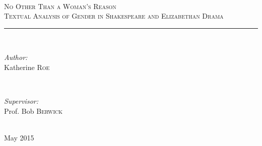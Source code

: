 \documentclass[12pt]{article} %
\begin{document}

\begin{titlepage}

\newcommand{\HRule}{\rule{\linewidth}{0.5mm}} %


\center %

\textsc{\LARGE   }\\[1.5cm] %
\textsc{\Large No Other Than a Woman's Reason}\\[0.5cm] %
\textsc{\large Textual Analysis of Gender in Shakespeare and Elizabethan Drama}\\[0.5cm] %

\HRule \\[0.4cm]

\begin{minipage}{0.4\textwidth}
\begin{flushleft} \large
\emph{Author:}\\
Katherine \textsc{Roe} %
\end{flushleft}
\end{minipage}
~
\begin{minipage}{0.4\textwidth}
\begin{flushright} \large
\emph{Supervisor:} \\
Prof. Bob \textsc{Berwick} %
\end{flushright}
\end{minipage}\\[4cm]

{\large
}\large May 2015 %


\vfill %

\end{titlepage}

\end{document}
